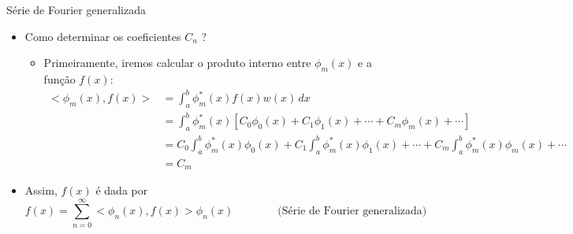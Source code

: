      \begin{slide}[toc=]{Série de Fourier generalizada}
	     \begin{itemize}
		     \item Como determinar os coeficientes $C_n$ ?
			     \begin{itemize}
				     \item Primeiramente, iremos calcular o produto interno entre $\phi_m(x)$ e a função $f(x)$:
					     \begin{align*}
						     <\phi_m(x), f(x)> &= \int_a^b \phi_m^\ast (x) f(x) w(x)\, dx\\
						                       &= \int_a^b \phi_m^\ast (x) \left [C_0\phi_0(x) + C_1\phi_1(x) + \cdots + C_m\phi_m(x) + \cdots \right ]\\
								       &= C_0\int_a^b \phi_m^\ast(x)\phi_0(x) + C_1\int_a^b \phi_m^\ast(x)\phi_1(x)+ \cdots + C_m\int_a^b \phi_m^\ast(x)\phi_m(x)+ \cdots\\
								       &= C_m
					     \end{align*}
			     \end{itemize}
		     \item Assim, $f(x)$ é dada por
			     \begin{equation*}
				     f(x) = \sum_{n=0}^\infty <\phi_n(x),f(x)>\phi_n(x)\qquad\qquad\text{(Série de Fourier generalizada)}
			     \end{equation*}
			     
	     \end{itemize}
     \end{slide}

	
